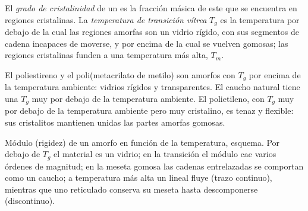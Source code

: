\begin{definition}\label{def:b2:polymer-synthesis:transitions}
El \emph{grado de cristalinidad} de un  es la fracción másica de
este que se encuentra en regiones cristalinas. La \emph{temperatura de transición vítrea}
$T_g$ es la temperatura por debajo de la cual las regiones amorfas son un vidrio rígido, con sus segmentos de
cadena incapaces de moverse, y por encima de la cual se vuelven gomosas; las regiones cristalinas funden a una temperatura
más alta, $T_m$.
\end{definition}

El poliestireno y el poli(metacrilato de metilo) son amorfos con $T_g$ por encima de la temperatura ambiente: vidrios rígidos y
transparentes. El caucho natural tiene una $T_g$ muy por debajo de la temperatura ambiente. El polietileno, con $T_g$ muy
por debajo de la temperatura ambiente pero muy cristalino, es tenaz y flexible: sus cristalitos mantienen unidas las partes
amorfas gomosas.

\begin{omfigure}
\par\vspace{4pt}

{\small Módulo (rigidez) de un  amorfo en función de la temperatura, esquema. Por debajo de $T_g$ el
material es un vidrio; en la transición el módulo cae varios órdenes de magnitud; en la meseta
gomosa las cadenas entrelazadas se comportan como un caucho; a temperatura más alta un  lineal fluye (trazo
continuo), mientras que uno reticulado conserva su meseta hasta descomponerse (discontinuo).}
\end{omfigure}

